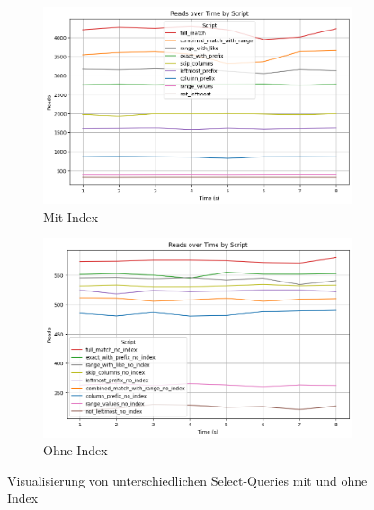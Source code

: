 \begin{figure}[H]
    \centering
    \begin{subfigure}[t]{0.48\textwidth}
        \centering
        \includegraphics[width=\textwidth]{PNGs/Script/Index/B_Tree/b-tree-query-differences/Reads}
        \caption{Mit Index}
        \label{indexing-b-tree-query-reads-index}
    \end{subfigure}
    \hfill
    \begin{subfigure}[t]{0.48\textwidth}
        \centering
        \includegraphics[width=\textwidth]{PNGs/Script/Index/B_Tree/b-tree-query-differences-no-index/Reads}
        \caption{Ohne Index}
        \label{indexing-b-tree-query-reads-no-index}
    \end{subfigure}
    \caption[B-Tree-Indexing: Unterschiedliche Selects mit Index und Ohne]{Visualisierung von unterschiedlichen Select-Queries mit und ohne Index}
    \label{fig:indexing-b-tree-query-reads}
\end{figure}
\vspace{-15pt}

